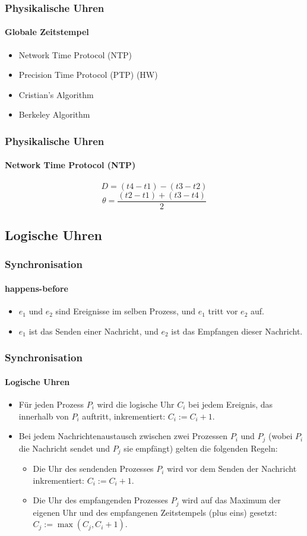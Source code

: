\begin{frame}
  \frametitle{Physikalische Uhren}
  \framesubtitle{Globale Zeitstempel}
  \begin{itemize}
    \item Network Time Protocol (NTP) 
    \item Precision Time Protocol (PTP) (HW)
    \item Cristian's Algorithm
    \item Berkeley Algorithm
  \end{itemize}
\end{frame}


\begin{frame}
  \frametitle{Physikalische Uhren}
  \framesubtitle{Network Time Protocol (NTP)}
\[ D = (t4 - t1) - (t3 - t2) \]
\[ \theta = \frac{(t2 - t1) + (t3 - t4)}{2} \]
\end{frame}

\subsection{Logische Uhren}
\begin{frame}
  \frametitle{Synchronisation}
  \framesubtitle{happens-before}
  \begin{itemize}
    \item $e_1$ und $e_2$ sind Ereignisse im selben Prozess, und $e_1$ tritt vor $e_2$ auf.
    \item $e_1$ ist das Senden einer Nachricht, und $e_2$ ist das Empfangen dieser Nachricht.
  \end{itemize}  
\end{frame}

\begin{frame}
  \frametitle{Synchronisation}
  \framesubtitle{Logische Uhren}
  \begin{itemize}
    \item Für jeden Prozess $P_i$ wird die logische Uhr $C_i$ bei jedem Ereignis, das innerhalb von $P_i$ auftritt, inkrementiert: $C_i := C_i + 1$.
    \item Bei jedem Nachrichtenaustausch zwischen zwei Prozessen $P_i$ und $P_j$ (wobei $P_i$ die Nachricht sendet und $P_j$ sie empfängt) gelten die folgenden Regeln:
      \begin{itemize}
      \item Die Uhr des sendenden Prozesses $P_i$ wird vor dem Senden der Nachricht inkrementiert: $C_i := C_i + 1$.
      \item Die Uhr des empfangenden Prozesses $P_j$ wird auf das Maximum der eigenen Uhr und des empfangenen Zeitstempels (plus eins) gesetzt: $C_j := \max(C_j, C_i + 1)$.
    \end{itemize}    
  \end{itemize}
\end{frame}

